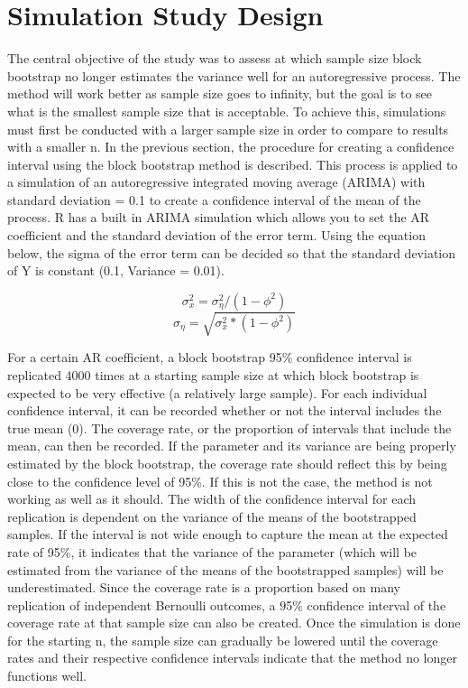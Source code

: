 \documentclass[12pt, letterpaper, titlepage]{article}
\begin{document}
\section{Simulation Study Design}
\label{sec:simdesign}

The central objective of the study was to assess at which sample size block bootstrap no longer estimates the variance well for an autoregressive process. The method will work better as sample size goes to infinity, but the goal is to see what is the smallest sample size that is acceptable. To achieve this, simulations must first be conducted with a larger sample size in order to compare to results with a smaller n. In the previous section, the procedure for creating a confidence interval using the block bootstrap method is described. This process is applied to a simulation of an autoregressive integrated moving average (ARIMA) with standard deviation = 0.1 to create a confidence interval of the mean of the process. R has a built in ARIMA simulation which allows you to set the AR coefficient and the standard deviation of the error term. Using the equation below, the sigma of the error term can be decided so that the standard deviation of Y is constant (0.1, Variance = 0.01). 

\[ \sigma_{x}^{2}=\sigma_{\eta}^{2}/\left( 1-\phi^2 \right)\]
\[\sigma_{\eta}=\sqrt{\sigma_{x}^{2}*\left( 1-\phi^2 \right)}\]

For a certain AR coefficient, a block bootstrap 95\% confidence interval is replicated 4000 times at a starting sample size at which block bootstrap is expected to be very effective (a relatively large sample). For each individual confidence interval, it can be recorded whether or not the interval includes the true mean (0). The coverage rate, or the proportion of intervals that include the mean, can then be recorded. If the parameter and its variance are being properly estimated by the block bootstrap, the coverage rate should reflect this by being close to the confidence level of 95\%. If this is not the case, the method is not working as well as it should. The width of the confidence interval for each replication is dependent on the variance of the means of the bootstrapped samples. If the interval is not wide enough to capture the mean at the expected rate of 95\%, it indicates that the variance of the parameter (which will be estimated from the variance of the means of the bootstrapped samples) will be underestimated. Since the coverage rate is a proportion based on many replication of independent Bernoulli outcomes, a 95\% confidence interval of the coverage rate at that sample size can also be created. Once the simulation is done for the starting n, the sample size can gradually be lowered until the coverage rates and their respective confidence intervals indicate that the method no longer functions well.
\end{document}
